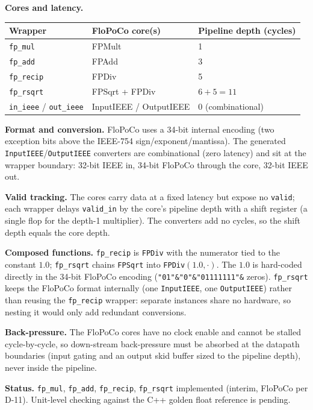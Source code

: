 \documentclass[11pt,a4paper]{article}
\newcommand{\field}[1]{\textbf{#1}\quad}
\begin{document}
\field{Cores and latency.}
\begin{center}
\begin{tabular}{@{}lll@{}}
\toprule
Wrapper & FloPoCo core(s) & Pipeline depth (cycles) \\
\midrule
\texttt{fp\_mul}    & FPMult          & 1 \\
\texttt{fp\_add}    & FPAdd           & 3 \\
\texttt{fp\_recip}  & FPDiv           & 5 \\
\texttt{fp\_rsqrt}  & FPSqrt + FPDiv  & $6+5=11$ \\
\texttt{in\_ieee} / \texttt{out\_ieee} & InputIEEE / OutputIEEE & 0 (combinational) \\
\bottomrule
\end{tabular}
\end{center}

\field{Format and conversion.} FloPoCo uses a 34-bit internal encoding (two
exception bits above the IEEE-754 sign/exponent/mantissa). The generated
\texttt{InputIEEE}/\texttt{OutputIEEE} converters are combinational (zero
latency) and sit at the wrapper boundary: 32-bit IEEE in, 34-bit FloPoCo through
the core, 32-bit IEEE out.

\field{Valid tracking.} The cores carry data at a fixed latency but expose no
\texttt{valid}; each wrapper delays \texttt{valid\_in} by the core's pipeline
depth with a shift register (a single flop for the depth-1 multiplier). The
converters add no cycles, so the shift depth equals the core depth.

\field{Composed functions.} \texttt{fp\_recip} is \texttt{FPDiv} with the
numerator tied to the constant $1.0$; \texttt{fp\_rsqrt} chains \texttt{FPSqrt}
into \texttt{FPDiv}$(1.0,\cdot)$. The $1.0$ is hard-coded directly in the 34-bit
FloPoCo encoding (\texttt{"01"\&"0"\&"01111111"\&} zeros). \texttt{fp\_rsqrt}
keeps the FloPoCo format internally (one \texttt{InputIEEE}, one
\texttt{OutputIEEE}) rather than reusing the \texttt{fp\_recip} wrapper: separate
instances share no hardware, so nesting it would only add redundant conversions.

\field{Back-pressure.} The FloPoCo cores have no clock enable and cannot be
stalled cycle-by-cycle, so down-stream back-pressure must be absorbed at the
datapath boundaries (input gating and an output skid buffer sized to the
pipeline depth), never inside the pipeline.

\field{Status.} \texttt{fp\_mul}, \texttt{fp\_add}, \texttt{fp\_recip},
\texttt{fp\_rsqrt} implemented (interim, FloPoCo per D-11). Unit-level checking
against the C++ golden float reference is pending.
\end{document}
